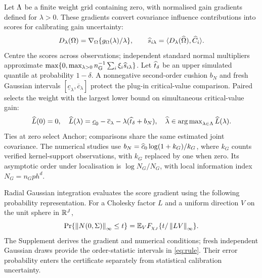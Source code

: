 Let $\Lambda$ be a finite weight grid containing zero, with normalised gain gradients defined for $\lambda>0$.
These gradients convert covariance influence contributions into scores for calibrating gain uncertainty:
\begin{equation}\label{eq:gradient}
 D_\lambda(\Omega)=\nabla_\Omega\{g_\Omega(\lambda)/\lambda\},\qquad
 \widehat s_{i\lambda}=\langle D_\lambda(\widehat\Omega),\widehat C_i\rangle.
\end{equation}
Centre the scores across observations; independent standard normal multipliers approximate $\max\{0,\max_{\lambda>0}n_{\mathrm{G}}^{-1}\sum_i\xi_i\widehat s_{i\lambda}\}$.
Let $\widehat t_\delta$ be an upper simulated quantile at probability $1-\delta$.
A nonnegative second-order cushion $b_N$ and fresh Gaussian intervals $[\underline c_\lambda,\overline c_\lambda]$ protect the plug-in critical-value comparison.
Paired selects the weight with the largest lower bound on simultaneous critical-value gain:
\begin{equation}\label{eq:rule}
 \widehat L(0)=0,\quad
 \widehat L(\lambda)=\underline c_0-\overline c_\lambda
                       -\lambda(\widehat t_\delta+b_N),\quad
 \widehat\lambda\in\operatorname{arg\,max}_{\lambda\in\Lambda}\widehat L(\lambda).
\end{equation}
Ties at zero select Anchor; comparisons share the same estimated joint covariance.
The numerical studies use $b_N=\widehat c_0\log(1+k_G)/k_G$, where $k_G$ counts verified kernel-support observations, with $k_G$ replaced by one when zero.
Its asymptotic order under localisation is $\log N_G/N_G$, with local information index $N_G=n_Gph^d$.

Radial Gaussian integration evaluates the score gradient using the following probability representation.
For a Cholesky factor $L$ and a uniform direction $V$ on the unit sphere in $\mathbb R^J$,
\begin{equation}\label{eq:radial}
 \Pr\{\left\lVert N(0,\Sigma)\right\rVert_\infty\leq t\}
 =\mathbb E_V F_{\chi_J}\{t/\left\lVert LV\right\rVert_\infty\}.
\end{equation}
The Supplement derives the gradient and numerical conditions; fresh independent Gaussian draws provide the order-statistic intervals in \eqref{eq:rule}.
Their error probability enters the certificate separately from statistical calibration uncertainty.
